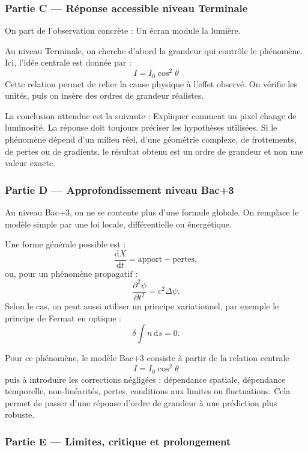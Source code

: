 \documentclass[11pt,a4paper]{article}
\begin{document}
\subsubsection*{Partie C — Réponse accessible niveau Terminale}

\begin{corrigebox}
On part de l'observation concrète : Un écran module la lumière.

Au niveau Terminale, on cherche d'abord la grandeur qui contrôle le phénomène. Ici, l'idée centrale est donnée par :
\[
I=I_0\cos^2\theta
\]
Cette relation permet de relier la cause physique à l'effet observé. On vérifie les unités, puis on insère des ordres de grandeur réalistes.

La conclusion attendue est la suivante : Expliquer comment un pixel change de luminosité. La réponse doit toujours préciser les hypothèses utilisées. Si le phénomène dépend d'un milieu réel, d'une géométrie complexe, de frottements, de pertes ou de gradients, le résultat obtenu est un ordre de grandeur et non une valeur exacte.
\end{corrigebox}

\subsubsection*{Partie D — Approfondissement niveau Bac+3}

\begin{approfondissementbox}
Au niveau Bac+3, on ne se contente plus d'une formule globale. On remplace le modèle simple par une loi locale, différentielle ou énergétique.

Une forme générale possible est :
\[
\frac{\mathrm d X}{\mathrm dt}=\text{apport}-\text{pertes},
\]
ou, pour un phénomène propagatif :
\[
\frac{\partial^2 \psi}{\partial t^2}=c^2\Delta\psi.
\]
Selon le cas, on peut aussi utiliser un principe variationnel, par exemple le principe de Fermat en optique :
\[
\delta \int n\,\mathrm ds=0.
\]

Pour ce phénomène, le modèle Bac+3 consiste à partir de la relation centrale
\[
I=I_0\cos^2\theta
\]
puis à introduire les corrections négligées : dépendance spatiale, dépendance temporelle, non-linéarités, pertes, conditions aux limites ou fluctuations. Cela permet de passer d'une réponse d'ordre de grandeur à une prédiction plus robuste.
\end{approfondissementbox}

\subsubsection*{Partie E — Limites, critique et prolongement}
\end{document}
